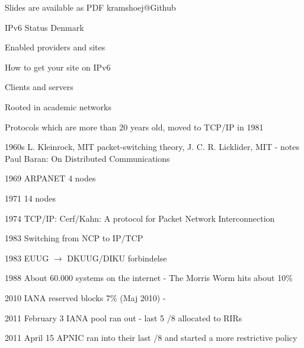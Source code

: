 \documentclass[20pt,landscape,a4paper,footrule]{foils}
\begin{document}


\vskip 2cm
\centerline{\footnotesize Slides are available as PDF kramshoej@Github}


\begin{list1}
\item IPv6 Status Denmark
\item Enabled providers and sites
\item How to get your site on IPv6
\end{list1}




\begin{list1}
\item Clients and servers
\item Rooted in academic networks
\item Protocols which are more than 20 years old, moved to TCP/IP in 1981
\end{list1}




\begin{list2}
\item[1960s]  L. Kleinrock, MIT packet-switching theory,  J. C. R. Licklider, MIT - notes
  Paul Baran: On Distributed Communications
\item[1969]  ARPANET 4 nodes
\item[1971]  14 nodes
\item[1974]  TCP/IP: Cerf/Kahn: A protocol for Packet
        Network Interconnection
\item[1983]  Switching from NCP to IP/TCP
\item[1983]  EUUG $\rightarrow$ DKUUG/DIKU forbindelse
\item[1988]  About 60.000 systems on the internet -
        The Morris Worm hits about 10\%
\item[2010] IANA reserved blocks 7\% (Maj 2010) - 
\item[2011] February 3 IANA pool ran out - last 5 /8 allocated to RIRs
\item[2011] April 15 APNIC ran into their last /8 and started a more restrictive policy
\end{list2}
\end{document}

